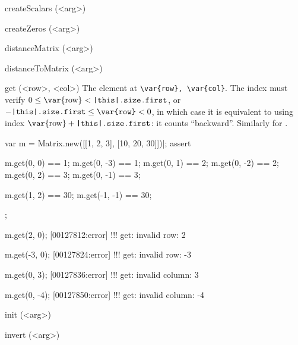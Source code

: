 \begin{urbiscriptapi}
\item[createScalars](<arg>)%
\begin{urbiassert}

\end{urbiassert}

\item[createZeros](<arg>)%
\begin{urbiassert}

\end{urbiassert}

\item[distanceMatrix](<arg>)%
\begin{urbiassert}

\end{urbiassert}

\item[distanceToMatrix](<arg>)%
\begin{urbiassert}

\end{urbiassert}

\item[get](<row>, <col>)%
  The element at \lstinline|\var{row}, \var{col}|.  The index  must
  verify $0 \le \textrm{\var{row}} < \texttt{\this.size.first}$, or
  $-\texttt{\this.size.first} \le \texttt{\var{row}} < 0$, in which case it
  is equivalent to using index $\textrm{\var{row}} +
  \texttt{\this.size.first}$: it counts ``backward''.  Similarly for
  .
\begin{urbiscript}
var m = Matrix.new([[1, 2, 3], [10, 20, 30]])|;
assert
{
  m.get(0, 0) == 1;   m.get(0, -3) == 1;
  m.get(0, 1) == 2;   m.get(0, -2) == 2;
  m.get(0, 2) == 3;   m.get(0, -1) == 3;

  m.get(1, 2) == 30;  m.get(-1, -1) == 30;
};

m.get(2, 0);
[00127812:error] !!! get: invalid row: 2

m.get(-3, 0);
[00127824:error] !!! get: invalid row: -3

m.get(0, 3);
[00127836:error] !!! get: invalid column: 3

m.get(0, -4);
[00127850:error] !!! get: invalid column: -4
\end{urbiscript}

\item[init](<arg>)%
\begin{urbiassert}

\end{urbiassert}

\item[invert](<arg>)%
\begin{urbiassert}


\end{urbiassert}
\end{urbiscriptapi}
